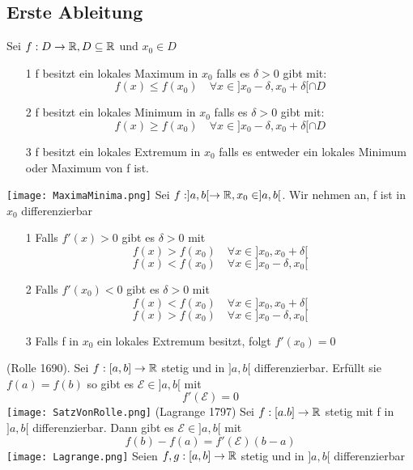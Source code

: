 \subsection{Erste Ableitung}
\Def[4.14] Sei \(f: D \rightarrow \mathbb{R}, D \subseteq \mathbb{R} \) und \(x_0 \in D\)
\begin{enumerate}
    \item [1] f besitzt ein lokales Maximum in \(x_0\) falls es \( \delta > 0 \) gibt mit:
    \[f(x) \leq f(x_0) \quad \forall x \in ]x_0 - \delta, x_0 + \delta [ \cap D\]
    \item [2] f besitzt ein lokales Minimum in \(x_0\) falls es \( \delta > 0 \) gibt mit:
    \[f(x) \geq f(x_0) \quad \forall x \in ]x_0 - \delta, x_0 + \delta[ \cap D\]
    \item [3] f besitzt ein lokales Extremum in \(x_0\) falls es entweder ein lokales Minimum oder Maximum von f ist.
\end{enumerate}
\texttt{[image: MaximaMinima.png]}
\Satz[4.15] Sei \(f: ]a,b[ \rightarrow \mathbb{R}, x_0 \in ]a,b[\). Wir nehmen an, f ist in \(x_0\) differenzierbar
\begin{enumerate}
    \item [1] Falls \(f'(x) > 0\) gibt es \( \delta > 0\) mit
    \[f(x) > f(x_0) \quad \forall x \in ]x_0,x_0 + \delta [\]
    \[f(x) < f(x_0) \quad \forall x \in ]x_0 - \delta ,x_0[\]
    \item [2] Falls \(f'(x_0) < 0 \) gibt es \( \delta > 0\) mit
    \[f(x) < f(x_0) \quad \forall x \in ]x_0,x_0 + \delta [\]
    \[f(x) > f(x_0) \quad \forall x \in ]x_0 - \delta ,x_0[\]
    \item [3] Falls f in \(x_0\) ein lokales Extremum besitzt, folgt \(f'(x_0) = 0\)
\end{enumerate}
\Satz[4.16] (Rolle 1690). Sei \(f: [a,b] \rightarrow \mathbb{R} \) stetig und in \(]a,b[\) differenzierbar. Erfüllt sie \(f(a) = f(b)\) so gibt es \(\mathcal{E} \in ]a,b[\) mit 
\[f'(\mathcal{E}) = 0\]
\hspace*{-3mm}\texttt{[image: SatzVonRolle.png]}
\Satz[4.17] (Lagrange 1797) Sei \(f : [a.b] \rightarrow \mathbb{R} \) stetig mit f in \(]a,b[\) differenzierbar. Dann gibt es \( \mathcal{E} \in ]a,b[ \) mit 
\[f(b) - f(a) = f'(\mathcal{E})(b-a)\]
\texttt{[image: Lagrange.png]}
\Korollar[4.18] Seien \(f,g : [a,b] \rightarrow \mathbb{R}\) stetig und in \(]a,b[\) differenzierbar
